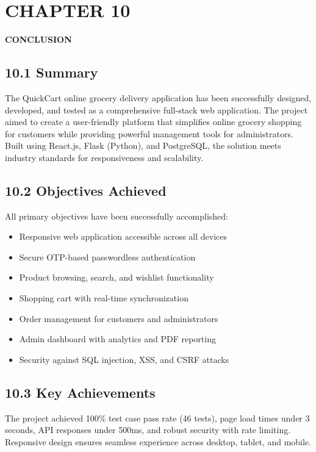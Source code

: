 \documentclass[12pt,a4paper]{report}
\begin{document}
\chapter*{CHAPTER 10}

\begin{center}
    \textbf{\large CONCLUSION}
\end{center}

\section*{10.1 Summary}

The QuickCart online grocery delivery application has been successfully designed, developed, and tested as a comprehensive full-stack web application. The project aimed to create a user-friendly platform that simplifies online grocery shopping for customers while providing powerful management tools for administrators. Built using React.js, Flask (Python), and PostgreSQL, the solution meets industry standards for responsiveness and scalability.

\section*{10.2 Objectives Achieved}

All primary objectives have been successfully accomplished:
\begin{itemize}
    \item Responsive web application accessible across all devices
    \item Secure OTP-based passwordless authentication
    \item Product browsing, search, and wishlist functionality
    \item Shopping cart with real-time synchronization
    \item Order management for customers and administrators
    \item Admin dashboard with analytics and PDF reporting
    \item Security against SQL injection, XSS, and CSRF attacks
\end{itemize}

\section*{10.3 Key Achievements}

The project achieved 100\% test case pass rate (46 tests), page load times under 3 seconds, API responses under 500ms, and robust security with rate limiting. Responsive design ensures seamless experience across desktop, tablet, and mobile.
\end{document}
